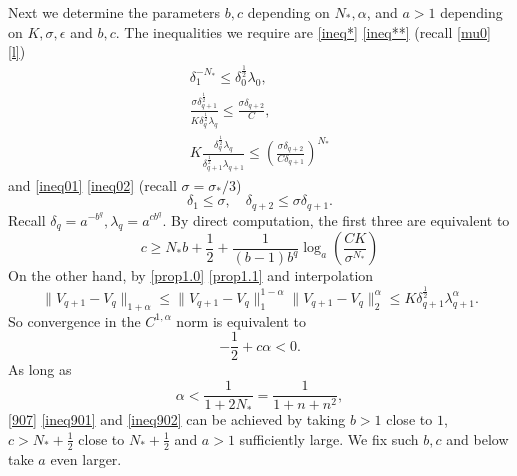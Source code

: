 \documentclass[reqno,12pt]{amsart}
\numberwithin{equation}{section}
\theoremstyle{plain}
\theoremstyle{definition}
\begin{document}
Next we determine the parameters $b,c$ depending on $N_*,\alpha$, and $a>1$ depending on $K,\sigma,\epsilon$ and $b,c$. The inequalities we require are \eqref{ineq*} \eqref{ineq**} (recall \eqref{mu0} \eqref{l})
\begin{gather*}
    \delta_1^{-N_*}\le \delta_0^\frac{1}{2}\lambda_0,\\
    \frac{\sigma\delta_{q+1}^\frac{1}{2}}{K\delta_q^\frac{1}{2}\lambda_q}\le\frac{\sigma\delta_{q+2}}{C},\\
    K\frac{\delta_q^\frac{1}{2}\lambda_q}{\delta_{q+1}^\frac{1}{2}\lambda_{q+1}}\le
    (\frac{\sigma\delta_{q+2}}{C\delta_{q+1}})^{N_*}
\end{gather*}
and \eqref{ineq01} \eqref{ineq02} (recall $\sigma=\sigma_*/3$)
\begin{equation}\label{907}
    \delta_1\le{\sigma},\quad
    \delta_{q+2}\le {\sigma}\delta_{q+1}.
\end{equation}
Recall $\delta_q=a^{-b^q},\lambda_q=a^{cb^q}$. By direct computation, the first three are equivalent to
\begin{equation}\label{ineq901}
    c\ge N_* b+\frac{1}{2}+\frac{1}{(b-1)b^q}\log_a(\frac{CK}{\sigma^{N_*}})
\end{equation}
On the other hand, by \eqref{prop1.0} \eqref{prop1.1} and interpolation
\begin{equation}\label{interp}
    \|V_{q+1}-V_q\|_{1+\alpha}\leq \|V_{q+1}-V_q\|_1^{1-\alpha} \|V_{q+1}-V_q\|_2^{\alpha}\le K\delta_{q+1}^\frac{1}{2}\lambda_{q+1}^\alpha.
\end{equation}
So convergence in the $C^{1,\alpha}$ norm is equivalent to
\begin{equation}\label{ineq902}
    -\frac{1}{2}+c\alpha<0.
\end{equation}
As long as
\begin{equation*}
    \alpha<\frac{1}{1+2N_*}=\frac{1}{1+n+n^2},
\end{equation*}
\eqref{907} \eqref{ineq901} and \eqref{ineq902} can be achieved by taking $b>1$ close to $1$, $c>N_*+\frac{1}{2}$ close to $N_*+\frac{1}{2}$ and $a>1$ sufficiently large.
We fix such $b,c$ and below take $a$ even larger.
\end{document}
